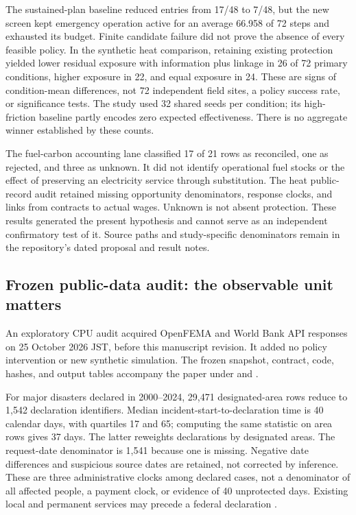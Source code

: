 \documentclass[11pt,a4paper]{article}
\numberwithin{equation}{section}
\theoremstyle{definition}
\theoremstyle{plain}
\theoremstyle{remark}
\begin{document}
The sustained-plan baseline reduced entries from 17/48 to 7/48, but the new screen kept emergency operation active for an average 66.958 of 72 steps and exhausted its budget. Finite candidate failure did not prove the absence of every feasible policy. In the synthetic heat comparison, retaining existing protection yielded lower residual exposure with information plus linkage in 26 of 72 primary conditions, higher exposure in 22, and equal exposure in 24. These are signs of condition-mean differences, not 72 independent field sites, a policy success rate, or significance tests. The study used 32 shared seeds per condition; its high-friction baseline partly encodes zero expected effectiveness. There is no aggregate winner established by these counts.

The fuel-carbon accounting lane classified 17 of 21 rows as reconciled, one as rejected, and three as unknown. It did not identify operational fuel stocks or the effect of preserving an electricity service through substitution. The heat public-record audit retained missing opportunity denominators, response clocks, and links from contracts to actual wages. Unknown is not absent protection. These results generated the present hypothesis and cannot serve as an independent confirmatory test of it. Source paths and study-specific denominators remain in the repository's dated proposal and result notes.

\subsection{Frozen public-data audit: the observable unit matters}
\label{sec:descriptive}

An exploratory CPU audit acquired OpenFEMA and World Bank API responses on 25 October 2026 JST, before this manuscript revision. It added no policy intervention or new synthetic simulation. The frozen snapshot, contract, code, hashes, and output tables accompany the paper under  and .

For major disasters declared in 2000--2024, 29,471 designated-area rows reduce to 1,542 declaration identifiers. Median incident-start-to-declaration time is 40 calendar days, with quartiles 17 and 65; computing the same statistic on area rows gives 37 days. The latter reweights declarations by designated areas. The request-date denominator is 1,541 because one is missing. Negative date differences and suspicious source dates are retained, not corrected by inference. These are three administrative clocks among declared cases, not a denominator of all affected people, a payment clock, or evidence of 40 unprotected days. Existing local and permanent services may precede a federal declaration \citep{fema2026data}.
\end{document}
